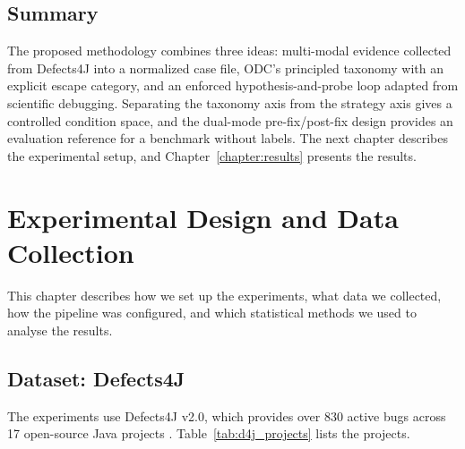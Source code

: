 \documentclass{iutbscthesis}
\begin{document}
\section{Summary}

The proposed methodology combines three ideas: multi-modal evidence collected from Defects4J into a normalized case file, ODC's principled taxonomy with an explicit escape category, and an enforced hypothesis-and-probe loop adapted from scientific debugging. Separating the taxonomy axis from the strategy axis gives a controlled condition space, and the dual-mode pre-fix/post-fix design provides an evaluation reference for a benchmark without labels. The next chapter describes the experimental setup, and Chapter~\ref{chapter:results} presents the results.


\chapter{Experimental Design and Data Collection} \label{chapter:experiment}

This chapter describes how we set up the experiments, what data we collected, how the pipeline was configured, and which statistical methods we used to analyse the results.

\section{Dataset: Defects4J}

The experiments use Defects4J v2.0, which provides over 830 active bugs across 17 open-source Java projects \cite{just2014defects4j}. Table~\ref{tab:d4j_projects} lists the projects.
\end{document}
